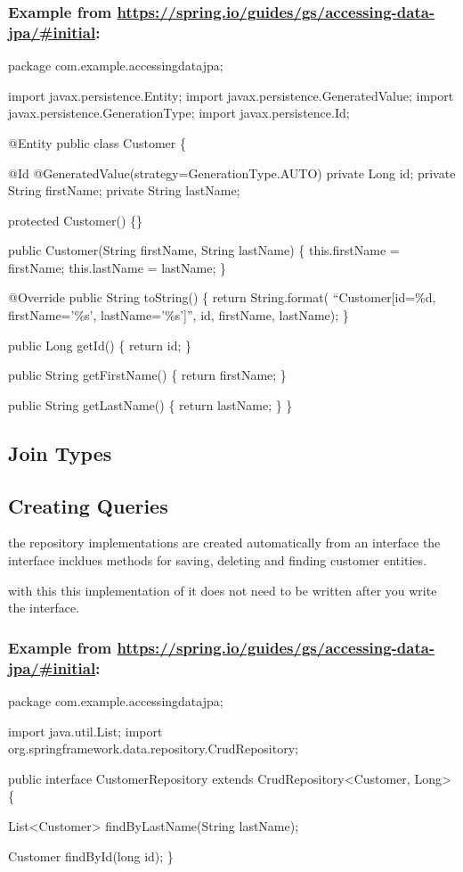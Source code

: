 \documentclass[11pt]{article}
\begin{document}
\subsubsection{Example from \url{https://spring.io/guides/gs/accessing-data-jpa/\#initial}:}
\label{sec:org6aa5f84}
\begin{java}
package com.example.accessingdatajpa;

import javax.persistence.Entity;
import javax.persistence.GeneratedValue;
import javax.persistence.GenerationType;
import javax.persistence.Id;

@Entity
public class Customer \{

@Id
@GeneratedValue(strategy=GenerationType.AUTO)
private Long id;
private String firstName;
private String lastName;

protected Customer() \{\}

public Customer(String firstName, String lastName) \{
  this.firstName = firstName;
  this.lastName = lastName;
\}

@Override
public String toString() \{
  return String.format(
      ``Customer[id=\%d, firstName='\%s', lastName='\%s']'',
      id, firstName, lastName);
\}

public Long getId() \{
  return id;
\}

public String getFirstName() \{
  return firstName;
\}

  public String getLastName() \{
    return lastName;
  \}
\}
\end{java}

\subsection{Join Types}
\label{sec:org59aab51}
\subsection{Creating Queries}
\label{sec:org1acf66a}
the repository implementations are created automatically from an interface
the interface incldues methods for saving, deleting and finding customer entities.

with this this implementation of it does not need to be written after you write the interface.

\subsubsection{Example from \url{https://spring.io/guides/gs/accessing-data-jpa/\#initial}:}
\label{sec:orgb25b336}
\begin{java}
package com.example.accessingdatajpa;

import java.util.List;
import org.springframework.data.repository.CrudRepository;

public interface CustomerRepository extends CrudRepository<Customer, Long> \{

List<Customer> findByLastName(String lastName);

  Customer findById(long id);
\}
\end{java}
\end{document}
